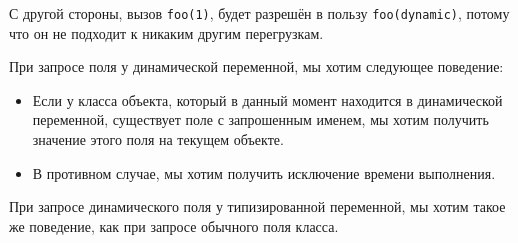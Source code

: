 С другой стороны, вызов \texttt{foo(1)}, будет разрешён в пользу \texttt{foo(dynamic)}, потому что он не подходит к никаким другим перегрузкам.

При запросе поля у динамической переменной, мы хотим следующее поведение:

\begin{itemize}
    \item Если у класса объекта, который в данный момент находится в динамической переменной, существует поле с запрошенным именем, мы хотим получить значение этого поля на текущем объекте.
    \item В противном случае, мы хотим получить исключение времени выполнения.
\end{itemize}

При запросе динамического поля у типизированной переменной, мы хотим такое же поведение, как при запросе обычного поля класса.